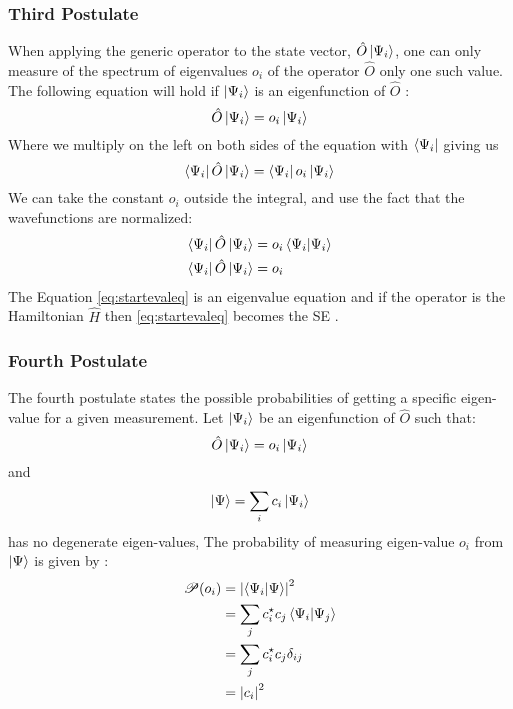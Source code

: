 \documentclass[../master_thesis.tex]{subfiles}
\begin{document}
\subsubsection{Third Postulate}
When applying the generic operator to the state vector, $\hat{O}\ket{\Psi_i}$,
one can only measure of the spectrum of eigenvalues $o_i$ of the operator $\hat{O}$
only one such value. The following equation will hold if $\ket{\Psi_i}$ is an
eigenfunction of $\hat{O}$
\cite{Cohen:1973, Atkins:2014}:
\begin{equation}
  \hat{O}\ket{\Psi_i} = o_i\ket{\Psi_i}\label{eq:startevaleq}
\end{equation}
Where we multiply on the left on both sides of the equation with $\bra{\Psi_i}$
giving us
\begin{equation}
  \bra{\Psi_i}\hat{O}\ket{\Psi_i} = \bra{\Psi_i}o_i\ket{\Psi_i}
\end{equation}
We can take the constant $o_i$ outside the integral, and
use the fact that the wavefunctions are normalized:
\begin{align}
  \begin{split}
    \bra{\Psi_i}\hat{O}\ket{\Psi_i} &= o_i\braket{\Psi_i|\Psi_i}\\
    \bra{\Psi_i}\hat{O}\ket{\Psi_i} &= o_i \label{eq:endevaleq}
  \end{split}
\end{align}
The Equation \ref{eq:startevaleq} is an eigenvalue equation and if the operator is
the Hamiltonian $\hat{H}$ then \ref{eq:startevaleq} becomes the \ac{SE} \cite{Cramer:2004}.

\subsubsection{Fourth Postulate}
The fourth postulate states the possible probabilities of getting a specific
eigen-value for a given measurement.
Let $\ket{\Psi_i}$ be an eigenfunction of $\hat{O}$ such that:
\begin{equation}
  \hat{O}\ket{\Psi_i} = o_i\ket{\Psi_i}
\end{equation}
and
\begin{equation}
  \ket{\Psi} = \sum_i c_i \ket{\Psi_i} \label{eq:lincomb}
\end{equation}
has no degenerate eigen-values,
The probability of measuring eigen-value $o_i$ from $\ket{\Psi}$ is given by
\cite{Cohen:1973}:
\begin{align} \label{eq:post4}
  \begin{split}
    \mathscr{P}(o_i) &= \abs{\braket{\Psi_i|\Psi}}^2\\
                     &= \sum_{j}c_i^\star c_j\braket{\Psi_i|\Psi_j}\\
                     &= \sum_{j}c_i^\star c_j\delta_{ij}\\
                     &= \abs{c_i}^2
  \end{split}
\end{align}
\end{document}
